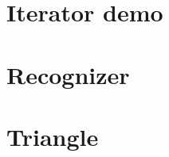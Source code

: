 \documentclass[11pt, listof=totoc]{article}
\begin{document}
  \thispagestyle{empty} \makeheading \tableofcontents \newpage \setcounter{page}{1}

  \section{Iterator demo}       
  \newpage \section{Recognizer} 
  \newpage \section{Triangle}   

  \newpage
  \renewcommand{\refname}{\thesection. References} 
  \printbibliography
   
\end{document}
